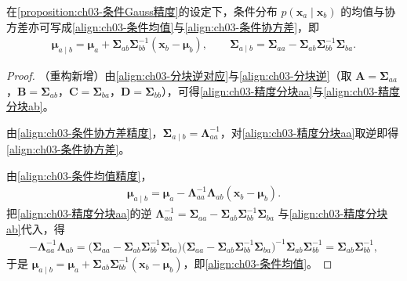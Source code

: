 \documentclass[../../main.tex]{subfiles}
\begin{document}
\begin{proposition}\label{proposition:ch03-条件Gauss协方差}
在\cref{proposition:ch03-条件Gauss精度}的设定下，条件分布 $p(\boldsymbol{x}_{a}\mid\boldsymbol{x}_{b})$ 的均值与协方差亦可写成\eqref{align:ch03-条件均值}与\eqref{align:ch03-条件协方差}，即
\begin{align*}
\boldsymbol{\mu}_{a\mid b}=\boldsymbol{\mu}_{a}+\boldsymbol{\Sigma}_{ab}\boldsymbol{\Sigma}_{bb}^{-1}(\boldsymbol{x}_{b}-\boldsymbol{\mu}_{b}),\qquad \boldsymbol{\Sigma}_{a\mid b}=\boldsymbol{\Sigma}_{aa}-\boldsymbol{\Sigma}_{ab}\boldsymbol{\Sigma}_{bb}^{-1}\boldsymbol{\Sigma}_{ba}.
\end{align*}
\end{proposition}
\begin{proof}
（重构新增）由\eqref{align:ch03-分块逆对应}与\eqref{align:ch03-分块逆}（取 $\boldsymbol{A}=\boldsymbol{\Sigma}_{aa}$，$\boldsymbol{B}=\boldsymbol{\Sigma}_{ab}$，$\boldsymbol{C}=\boldsymbol{\Sigma}_{ba}$，$\boldsymbol{D}=\boldsymbol{\Sigma}_{bb}$），可得\eqref{align:ch03-精度分块aa}与\eqref{align:ch03-精度分块ab}。

由\eqref{align:ch03-条件协方差精度}，$\boldsymbol{\Sigma}_{a\mid b}=\boldsymbol{\Lambda}_{aa}^{-1}$，对\eqref{align:ch03-精度分块aa}取逆即得\eqref{align:ch03-条件协方差}。

由\eqref{align:ch03-条件均值精度}，
\begin{align*}
\boldsymbol{\mu}_{a\mid b}=\boldsymbol{\mu}_{a}-\boldsymbol{\Lambda}_{aa}^{-1}\boldsymbol{\Lambda}_{ab}(\boldsymbol{x}_{b}-\boldsymbol{\mu}_{b}).
\end{align*}
把\eqref{align:ch03-精度分块aa}的逆 $\boldsymbol{\Lambda}_{aa}^{-1}=\boldsymbol{\Sigma}_{aa}-\boldsymbol{\Sigma}_{ab}\boldsymbol{\Sigma}_{bb}^{-1}\boldsymbol{\Sigma}_{ba}$ 与\eqref{align:ch03-精度分块ab}代入，得
\begin{align*}
-\boldsymbol{\Lambda}_{aa}^{-1}\boldsymbol{\Lambda}_{ab}=\bigl(\boldsymbol{\Sigma}_{aa}-\boldsymbol{\Sigma}_{ab}\boldsymbol{\Sigma}_{bb}^{-1}\boldsymbol{\Sigma}_{ba}\bigr)\bigl(\boldsymbol{\Sigma}_{aa}-\boldsymbol{\Sigma}_{ab}\boldsymbol{\Sigma}_{bb}^{-1}\boldsymbol{\Sigma}_{ba}\bigr)^{-1}\boldsymbol{\Sigma}_{ab}\boldsymbol{\Sigma}_{bb}^{-1}=\boldsymbol{\Sigma}_{ab}\boldsymbol{\Sigma}_{bb}^{-1},
\end{align*}
于是 $\boldsymbol{\mu}_{a\mid b}=\boldsymbol{\mu}_{a}+\boldsymbol{\Sigma}_{ab}\boldsymbol{\Sigma}_{bb}^{-1}(\boldsymbol{x}_{b}-\boldsymbol{\mu}_{b})$，即\eqref{align:ch03-条件均值}。
\end{proof}
\end{document}
